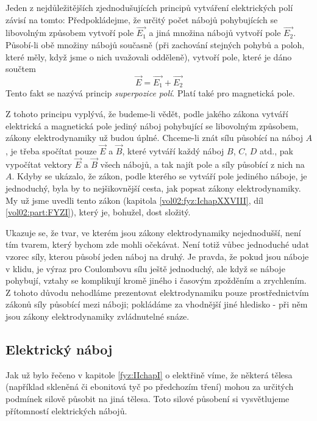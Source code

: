     Jeden z nejdůležitějších zjednodušujících principů vytváření elektrických polí závisí na tomto:
    Předpokládejme, že určitý počet nábojů pohybujících se libovolným způsobem vytvoří pole 
    \(\vec{E_1}\) a jiná množina nábojů vytvoří pole \(\vec{E_2}\). Působí-li obě množiny nábojů 
    současně (při zachování stejných pohybů a poloh, které měly, když jsme o nich uvažovali 
    odděleně), vytvoří pole, které je dáno součtem
    \begin{equation}\label{fyz:eq_fey_elmag03}
      \vec{E} = \vec{E_1} + \vec{E_2}
    \end{equation}
    Tento fakt se nazývá princip \emph{superpozice polí}. Platí také pro magnetická pole.
    
    Z tohoto principu vyplývá, že budeme-li vědět, podle jakého zákona vytváří elektrická a
    magnetická pole jediný náboj pohybující se libovolným způsobem, zákony elektrodynamiky už budou
    úplné. Chceme-li znát sílu působící na náboj \(A\), je třeba spočítat pouze \(\vec{E}\) a
    \(\vec{B}\), které vytváří každý náboj \(B\), \(C\), \(D\) atd., pak vypočítat vektory
    \(\vec{E}\) a \(\vec{B}\) všech nábojů, a tak najít  pole a síly působící z nich na \(A\). Kdyby
    se ukázalo, že zákon, podle kterého se vytváří pole jediného náboje, je jednoduchý, byla by to
    nejšikovnější cesta, jak popsat zákony elektrodynamiky. My už jsme uvedli tento zákon (kapitola
    \ref{vol02:fyz:IchapXXVIII}, díl \ref{vol02:part:FYZI}), který je, bohužel, dost složitý.
    
    Ukazuje se, že tvar, ve kterém jsou zákony elektrodynamiky nejednodušší, není tím tvarem, který 
    bychom zde mohli očekávat. Není totiž vůbec jednoduché udat vzorec síly, kterou působí jeden 
    náboj na druhý. Je pravda, že pokud jsou náboje v klidu, je výraz pro Coulombovu sílu ještě 
    jednoduchý, ale když se náboje pohybují, vztahy se komplikují kromě jiného i časovým zpožděním 
    a zrychlením. Z tohoto důvodu nehodláme prezentovat elektrodynamiku pouze prostřednictvím 
    zákonů síly působící mezi náboji; pokládáme za vhodnější jiné hledisko - při něm jsou zákony 
    elektrodynamiky zvládnutelné snáze.

    \subsection{Elektrický náboj}\label{fyz:IIchapIsecII} 
      Jak už bylo řečeno v kapitole \ref{fyz:IIchapI} o elektřině víme, že některá tělesa (například
      skleněná či ebonitová tyč po předchozím tření) mohou za určitých podmínek silově působit na
      jiná tělesa. Toto silové působení si vysvětlujeme přítomností elektrických nábojů.

